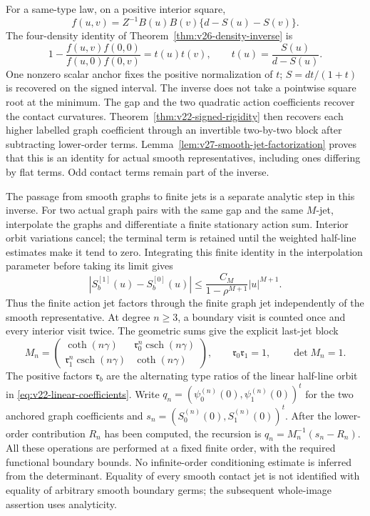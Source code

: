 For a same-type law, on a positive interior square,
\[
 f(u,v)=Z^{-1}B(u)B(v)\{d-S(u)-S(v)\}.
\]
The four-density identity of Theorem~\ref{thm:v26-density-inverse} is
\[
 1-\frac{f(u,v)f(0,0)}{f(u,0)f(0,v)}=t(u)t(v),\qquad
 t(u)=\frac{S(u)}{d-S(u)}.
\]
One nonzero scalar anchor fixes the positive normalization of $t$;
$S=dt/(1+t)$ is recovered on the signed interval.  The inverse does
not take a pointwise square root at the minimum.  The gap and the two
quadratic action coefficients recover the contact curvatures.
Theorem~\ref{thm:v22-signed-rigidity} then recovers each higher labelled
graph coefficient through an invertible two-by-two block after subtracting
lower-order terms.  Lemma~\ref{lem:v27-smooth-jet-factorization} proves
that this is an identity for actual smooth representatives, including
ones differing by flat terms.  Odd contact terms remain part of the
inverse.

The passage from smooth graphs to finite jets is a separate analytic
step in this inverse.  For two actual graph pairs with the same gap
and the same $M$-jet, interpolate the graphs and differentiate a
finite stationary action sum.  Interior orbit variations cancel;
the terminal term is retained until the weighted half-line estimates
make it tend to zero.  Integrating this finite identity in the
interpolation parameter before taking its limit gives
\begin{equation}\label{eq:v50-smooth-filtration}
 |S_b^{[1]}(u)-S_b^{[0]}(u)|
       \le \frac{C_M}{1-\rho^{M+1}}|u|^{M+1}.
\end{equation}
Thus the finite action jet factors through the finite graph jet
independently of the smooth representative.  At degree $n\ge3$,
a boundary visit is counted once and every interior visit twice.
The geometric sums give the explicit last-jet block
\begin{equation}\label{eq:v50-jet-block}
 M_n=\begin{pmatrix}
 \coth(n\gamma)&\mathfrak r_0^n\operatorname{csch}(n\gamma)\\
 \mathfrak r_1^n\operatorname{csch}(n\gamma)&\coth(n\gamma)
 \end{pmatrix},\qquad \mathfrak r_0\mathfrak r_1=1,
 \qquad \det M_n=1.
\end{equation}
The positive factors $\mathfrak r_b$ are the alternating type ratios
of the linear half-line orbit in \eqref{eq:v22-linear-coefficients}.
Write $q_n=(\psi_0^{(n)}(0),\psi_1^{(n)}(0))^t$ for the two
anchored graph coefficients and $s_n=(S_0^{(n)}(0),S_1^{(n)}(0))^t$.
After the lower-order contribution $R_n$ has been computed, the
recursion is $q_n=M_n^{-1}(s_n-R_n)$.  All these operations are
performed at a fixed finite order, with the required functional
boundary bounds.  No infinite-order conditioning estimate is inferred
from the determinant.  Equality of every smooth contact jet is not
identified with equality of arbitrary smooth boundary germs; the
subsequent whole-image assertion uses analyticity.

